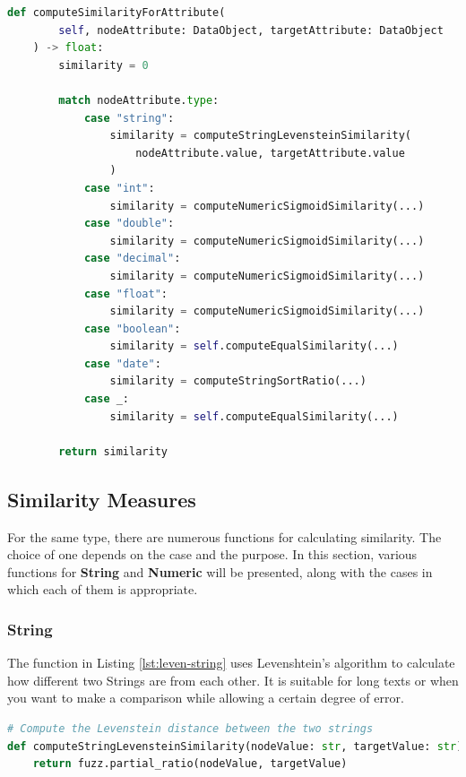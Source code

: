 \begin{lstlisting}[language=Python, caption=Function to compute the similarity value between two attributes, label={lst:comp-sim-att}]
def computeSimilarityForAttribute(
        self, nodeAttribute: DataObject, targetAttribute: DataObject
    ) -> float:
        similarity = 0

        match nodeAttribute.type:
            case "string":
                similarity = computeStringLevensteinSimilarity(
                    nodeAttribute.value, targetAttribute.value
                )
            case "int":
                similarity = computeNumericSigmoidSimilarity(...)
            case "double":
                similarity = computeNumericSigmoidSimilarity(...)
            case "decimal":
                similarity = computeNumericSigmoidSimilarity(...)
            case "float":
                similarity = computeNumericSigmoidSimilarity(...)
            case "boolean":
                similarity = self.computeEqualSimilarity(...)
            case "date":
                similarity = computeStringSortRatio(...)
            case _:
                similarity = self.computeEqualSimilarity(...)

        return similarity
\end{lstlisting}
    

\subsection{Similarity Measures}
For the same type, there are numerous functions for calculating similarity. The choice of one depends on the case and the purpose. In this section, various functions for \textbf{String} and \textbf{Numeric} will be presented, along with the cases in which each of them is appropriate.
    
    \subsubsection{String}
    The function in Listing \ref{lst:leven-string} uses Levenshtein's algorithm to calculate how different two Strings are from each other. It is suitable for long texts or when you want to make a comparison while allowing a certain degree of error.\\
    
\begin{lstlisting}[language=Python, caption=Levenstein distance between two strings, label={lst:leven-string}]
# Compute the Levenstein distance between the two strings
def computeStringLevensteinSimilarity(nodeValue: str, targetValue: str) -> float:
    return fuzz.partial_ratio(nodeValue, targetValue)
\end{lstlisting}
    
